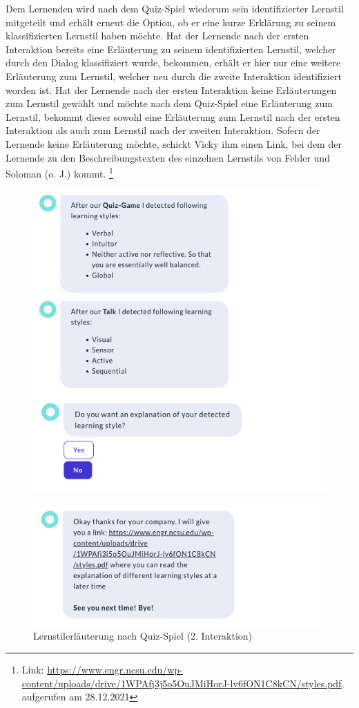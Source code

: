 Dem Lernenden wird nach dem Quiz-Spiel  wiederum sein
identifizierter Lernstil mitgeteilt und erhält erneut die Option,
ob er eine kurze Erklärung zu seinem klassifizierten Lernstil  
haben möchte. Hat der Lernende nach der ersten Interaktion 
bereits eine Erläuterung zu seinem identifizierten Lernstil, 
welcher durch den Dialog klassifiziert wurde, bekommen,
erhält er hier nur eine weitere Erläuterung zum Lernstil, 
welcher neu durch die zweite Interaktion identifiziert worden ist. 
Hat der Lernende nach der ersten Interaktion keine Erläuterungen zum 
Lernstil gewählt und möchte nach dem Quiz-Spiel  eine Erläuterung zum 
Lernstil, bekommt dieser sowohl eine Erläuterung zum Lernstil nach der ersten Interaktion 
als auch zum Lernstil nach der zweiten Interaktion.
Sofern der Lernende keine Erläuterung möchte,
schickt Vicky ihm einen Link, bei dem der Lernende zu den Beschreibungstexten des 
einzelnen Lernstils von Felder und Soloman (o. J.) kommt. \footnote{Link: \url{ https://www.engr.ncsu.edu/wp-content/uploads/drive/1WPAfj3j5o5OuJMiHorJ-lv6fON1C8kCN/styles.pdf}, aufgerufen am 28.12.2021}
\begin{figure}[H]
  \centering
  \includegraphics[width=0.7\linewidth]{images/Game/rec2.png}
  \includegraphics[width=0.7\linewidth]{images/Game/rec2.1.png}

\end{figure} 
\begin{figure}[H]
  \centering
  \includegraphics[width=0.7\linewidth]{images/Game/rec2.2.png}
 \caption[Lernstilerläuterung nach Quiz-Spiel (2. Interaktion)] {Lernstilerläuterung nach Quiz-Spiel (2. Interaktion)}
\label{fig:LernstilerläuterungQuiz}
\end{figure} 

